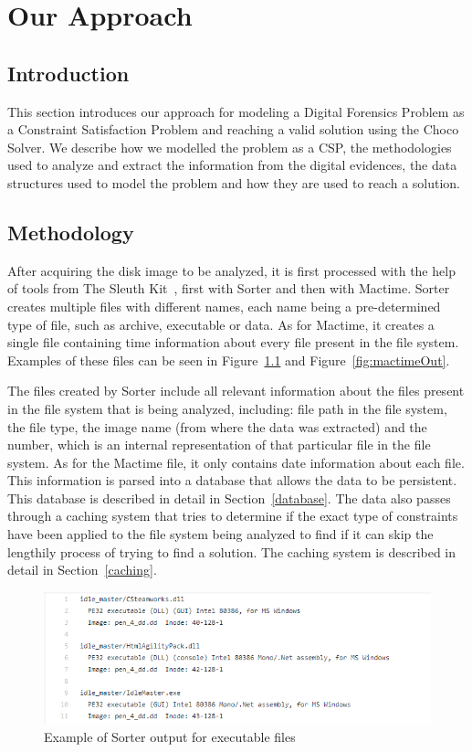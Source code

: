 \chapter{Our Approach}

\section{Introduction}

This section introduces our approach for modeling a Digital Forensics Problem as a Constraint Satisfaction Problem and reaching a valid solution using the Choco Solver. We describe how we modelled the problem as a CSP, the methodologies used to analyze and extract the information from the digital evidences, the data structures used to model the problem and how they are used to reach a solution.

\section{Methodology}

After acquiring the disk image to be analyzed, it is first processed with the help of tools from The Sleuth Kit~\cite{tsk}, first with Sorter and then with Mactime. Sorter creates multiple files with different names, each name being a pre-determined type of file, such as archive, executable or data. As for Mactime, it creates a single file containing time information about every file present in the file system. Examples of these files can be seen in Figure~\ref{fig:sorterOut} and Figure~\ref{fig:mactimeOut}. 

The files created by Sorter include all relevant information about the files present in the file system that is being analyzed, including: file path in the file system, the file type, the image name (from where the data was extracted) and the \INODE number, which is an internal representation of that particular file in the file system. As for the Mactime file, it only contains date information about each file. This information is parsed into a database that allows the data to be persistent. This database is described in detail in Section~\ref{database}. The data also passes through a caching system that tries to determine if the exact type of constraints have been applied to the file system being analyzed to find if it can skip the lengthily process of trying to find a solution. The caching system is described in detail in Section~\ref{caching}.

\begin{figure}
    \centering
    \includegraphics[width=120mm]{sorter_out.png}
    \caption{Example of Sorter output for executable files}
    \label{fig:sorterOut}
\end{figure}

